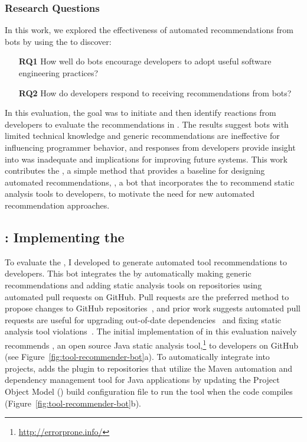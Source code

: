 \subsubsection{Research Questions}

In this work, we explored the effectiveness of automated recommendations from bots by using the \tele to discover:

\begin{itemize}[topsep=0pt,itemsep=-1ex,partopsep=1ex,parsep=1ex]
  \item[\textbf{RQ1}] How well do bots encourage developers to adopt useful software engineering practices?
  \item[\textbf{RQ2}] How do developers respond to receiving recommendations from bots?
\end{itemize}

In this evaluation, the goal was to initiate and then identify reactions from developers to evaluate the \tele recommendations in \toolone. The results suggest bots with limited technical knowledge and generic recommendations are ineffective for influencing programmer behavior, and responses from developers provide insight into \toolone was inadequate and implications for improving future systems. This work contributes the \tele, a simple method that provides a baseline for designing automated recommendations, \toolone, a bot that incorporates the \tele to recommend static analysis tools to developers, to motivate the need for new automated recommendation approaches.

\subsection{\toolone: Implementing the \tele} 

To evaluate the \tele, I developed \toolone to generate automated tool recommendations to developers. This bot integrates the \tele by automatically making generic recommendations and adding static analysis tools on repositories using automated pull requests on GitHub. Pull requests are the preferred method to propose changes to GitHub repositories~\cite{PullRequests}, and prior work suggests automated pull requests are useful for upgrading out-of-date dependencies~\cite{Samim2017AutoPullRequests} and fixing static analysis tool violations~\cite{C-3PR}. The initial implementation of \toolone in this evaluation naively recommends \EP, an open source Java static analysis tool,\footnote{\url{http://errorprone.info/}} to developers on GitHub (see Figure~\ref{fig:tool-recommender-bot}a). To automatically integrate \EP into projects, \toolone adds the \EP plugin to repositories that utilize the Maven automation and dependency management tool for Java applications by updating the Project Object Model (\pom) build configuration file to run the tool when the code compiles (Figure~\ref{fig:tool-recommender-bot}b). 

